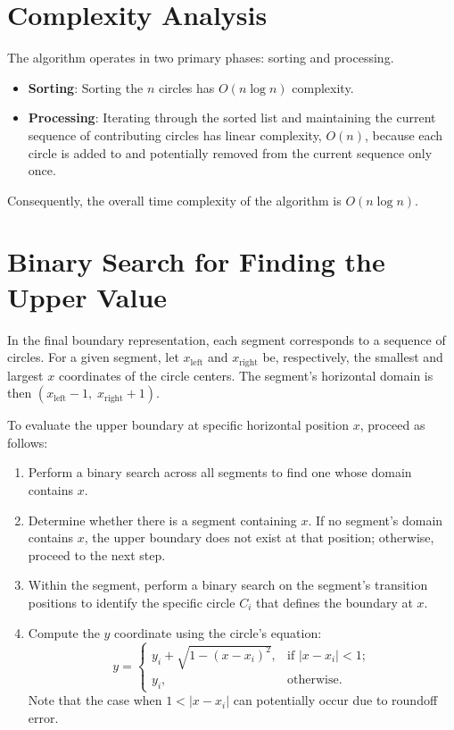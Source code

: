 \documentclass[12pt]{article}
\begin{document}
\section{Complexity Analysis}

The algorithm operates in two primary phases: sorting and processing.

\begin{itemize}
	\item \textbf{Sorting}: Sorting the \(n\) circles has \(O(n \log n)\) complexity.\cite{Knuth}
	
	\item \textbf{Processing}: Iterating through the sorted list and maintaining the current sequence of contributing circles has linear complexity, \(O(n)\),  because each circle is added to and potentially removed from the current sequence only once.
\end{itemize}

Consequently, the overall time complexity of the algorithm is \(O(n \log n)\).

\section{Binary Search for Finding the Upper Value}

In the final boundary representation, each segment corresponds to a sequence of circles. For a given segment, let \(x_{\mathrm{left}}\) and \(x_{\mathrm{right}}\) be, respectively, the smallest and largest \(x\) coordinates of the circle centers. The segment's horizontal domain is then \(\left( x_{\mathrm{left}}-1,\; x_{\mathrm{right}}+1 \right)\).\newline

To evaluate the upper boundary at specific horizontal position \(x\), proceed as follows:
\begin{enumerate}
	\item Perform a binary search across all segments to find one whose domain contains \(x\).
	\item Determine whether there is a segment containing \(x\). If no segment's domain contains \(x\), the upper boundary does not exist at that position; otherwise, proceed to the next step.
	\item Within the segment, perform a binary search on the segment's transition positions to identify the specific circle \(C_i\) that defines the boundary at \(x\).
	\item Compute the \(y\) coordinate using the circle's equation:
	\[
	y =
	\begin{cases}
		y_i + \sqrt{1 - (x - x_i)^2}, & \text{if } \lvert x - x_i \rvert < 1;\\
		y_i, & \text{otherwise}.
	\end{cases}
	\]
	Note that the case when $ 1 < \lvert x - x_i \rvert $ can potentially occur due to roundoff error.
\end{enumerate}
	
\end{document}
